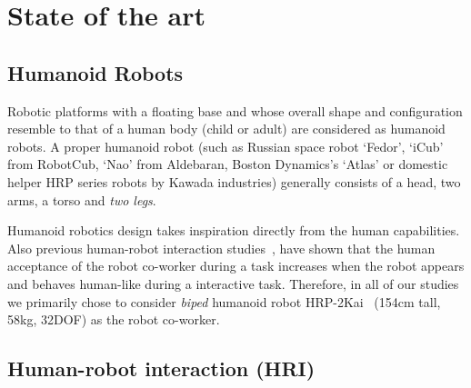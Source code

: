 
{\color{blue}\chapter{State of the art}\label{sota}}

\section{Humanoid Robots}

Robotic platforms with a floating base and whose overall shape and configuration resemble to that of a human body (child or adult) are considered as humanoid robots. A proper humanoid robot (such as Russian space robot `Fedor', `iCub' from RobotCub, `Nao' from Aldebaran, Boston Dynamics's `Atlas' or domestic helper HRP series robots by Kawada industries) generally consists of a head, two arms, a torso and \textit{two legs}.

Humanoid robotics design takes inspiration directly from the human capabilities. Also previous human-robot interaction studies~\cite{huber2008human, strabala2013toward, shibata1995experimental, Chaminade:JPP:2009}, have shown that the human acceptance of the robot co-worker during a task increases when the robot appears and behaves human-like during a interactive task. Therefore, in all of our studies we primarily chose to consider \textit{biped} humanoid robot HRP-2Kai~\cite{Kaneko:RAS_ICHR:2015} (154cm tall, 58kg, 32DOF) as the robot co-worker.
	


\section{Human-robot interaction (HRI)}

